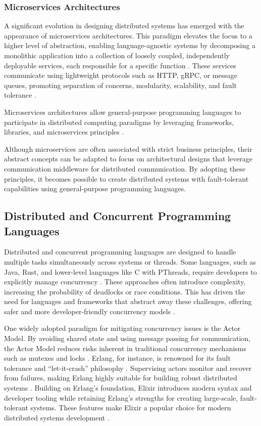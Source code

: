 \subsubsection{Microservices Architectures}

A significant evolution in designing distributed systems has emerged with the appearance of microservices architectures. This paradigm elevates the focus to a higher level of abstraction, enabling language-agnostic systems by decomposing a monolithic application into a collection of loosely coupled, independently deployable services, each responsible for a specific function \cite{Jamshidi2018}. These services communicate using lightweight protocols such as \gls{HTTP}, \gls{gRPC}, or message queues, promoting separation of concerns, modularity, scalability, and fault tolerance \cite{Jamshidi2018}.

Microservices architectures allow general-purpose programming languages to participate in distributed computing paradigms by leveraging frameworks, libraries, and microservices principles \cite{Guidi2017}.

Although microservices are often associated with strict business principles, their abstract concepts can be adapted to focus on architectural designs that leverage communication middleware for distributed communication. By adopting these principles, it becomes possible to create distributed systems with fault-tolerant capabilities using general-purpose programming languages.


\subsection{Distributed and Concurrent Programming Languages}

Distributed and concurrent programming languages are designed to handle multiple tasks simultaneously across systems or threads. Some languages, such as Java, Rust, and lower-level languages like C with PThreads, require developers to explicitly manage concurrency \cite{Valkov2018,Paduraru2018}. These approaches often introduce complexity, increasing the probability of deadlocks or race conditions. This has driven the need for languages and frameworks that abstract away these challenges, offering safer and more developer-friendly concurrency models \cite{Valkov2018}.

One widely adopted paradigm for mitigating concurrency issues is the Actor Model. By avoiding shared state and using message passing for communication, the Actor Model reduces risks inherent in traditional concurrency mechanisms such as mutexes and locks \cite{Valkov2018}. Erlang, for instance, is renowned for its fault tolerance and “let-it-crash” philosophy \cite{Armstrong2013}. Supervising actors monitor and recover from failures, making Erlang highly suitable for building robust distributed systems \cite{Armstrong2013}. Building on Erlang’s foundation, Elixir introduces modern syntax and developer tooling while retaining Erlang’s strengths for creating large-scale, fault-tolerant systems. These features make Elixir a popular choice for modern distributed systems development \cite{Juric2024}.

